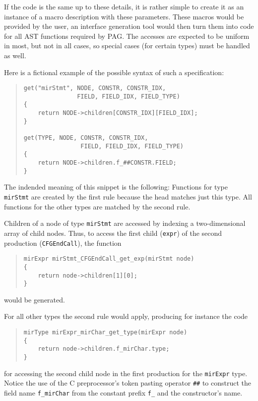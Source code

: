 If the code is the same up to these details, it is rather simple to
create it as an instance of a macro description with these
parameters. These macros would be provided by the user, an interface
generation tool would then turn them into code for all AST functions
required by PAG. The accesses are expected to be uniform in most,
but not in all cases, so special cases (for certain types) must be
handled as well.

Here is a fictional example of the possible syntax of such a
specification:

\begin{quote}
\begin{verbatim}
get("mirStmt", NODE, CONSTR, CONSTR_IDX, 
               FIELD, FIELD_IDX, FIELD_TYPE)
{
    return NODE->children[CONSTR_IDX][FIELD_IDX];
}

get(TYPE, NODE, CONSTR, CONSTR_IDX, 
                FIELD, FIELD_IDX, FIELD_TYPE)
{
    return NODE->children.f_##CONSTR.FIELD;
}
\end{verbatim}
\end{quote}

The indended meaning of this snippet is the following: Functions for
type \verb|mirStmt| are created by the first rule because the head
matches just this type. All functions for the other types are
matched by the second rule.

Children of a node of type \verb|mirStmt| are accessed by indexing a
two-dimensional array of child nodes. Thus, to access the first
child (\verb|expr|) of the second production (\verb|CFGEndCall|),
the function
\begin{quote}
\begin{verbatim} 
mirExpr mirStmt_CFGEndCall_get_exp(mirStmt node)
{
    return node->children[1][0];
}
\end{verbatim}
\end{quote}
would be generated.

For all other types the second rule would apply, producing for
instance the code
\begin{quote}
\begin{verbatim}
mirType mirExpr_mirChar_get_type(mirExpr node)
{
    return node->children.f_mirChar.type;
}
\end{verbatim}
\end{quote}
for accessing the second child node in the first production for the
\verb|mirExpr| type.
Notice the use of the C preprocessor's token pasting operator
\verb|##| to construct the field name \verb|f_mirChar| from the
constant prefix \verb|f_| and the constructor's name.

